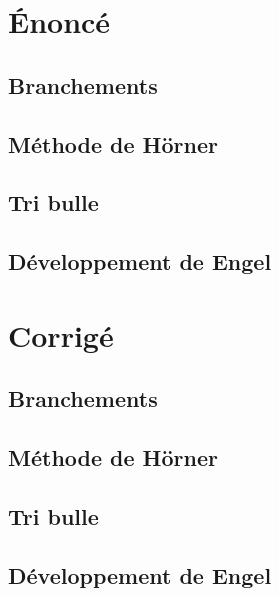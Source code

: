 

\section*{\'Enoncé}
\subsection{Branchements}

\subsection{Méthode de Hörner}

\subsection{Tri bulle}

\subsection{Développement de Engel}

\clearpage
\section*{Corrigé}
\subsection{Branchements}

\subsection{Méthode de Hörner}

\subsection{Tri bulle}

\subsection{Développement de Engel}


